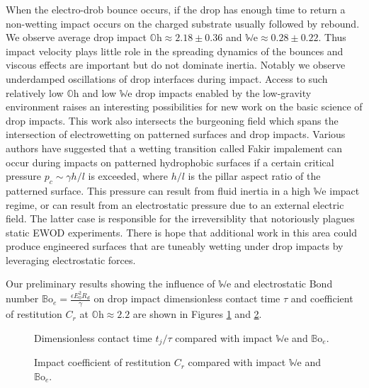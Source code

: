 \documentclass[12pt,a4paper,oneside]{book}
\begin{document}
When the electro-drob bounce occurs, if the drop has enough time to return a non-wetting impact occurs on the charged substrate usually followed by rebound. We observe average drop impact $\mathbb{O}\mbox{h} \approx 2.18 \pm 0.36$ and  $\mathbb{W}\mbox{e} \approx 0.28 \pm 0.22$. Thus impact velocity plays little role in the spreading dynamics of the bounces and viscous effects are important but do not dominate inertia. Notably we observe underdamped oscillations of drop interfaces during impact. Access to such relatively low $\mathbb{O}\mbox{h}$ and low $\mathbb{W}\mbox{e}$ drop impacts enabled by the low-gravity environment raises an interesting possibilities for new work on the basic science of drop impacts. This work also intersects the burgeoning field which spans the intersection of electrowetting on patterned surfaces and drop impacts. Various authors \cite{bartolo_bouncing_2006, reyssat_bouncing_2006} have suggested that a wetting transition called Fakir impalement can occur during impacts on patterned hydrophobic surfaces if a certain critical pressure $p_c \sim \gamma h/l$ is exceeded, where $h/l$ is the pillar aspect ratio of the patterned surface. This pressure can result from fluid inertia in a high $\mathbb{W}\mbox{e}$ impact regime, or can result from an electrostatic pressure due to an external electric field. The latter case is responsible for the irreversiblity that notoriously plagues static EWOD experiments. There is hope that additional work in this area could produce engineered surfaces that are tuneably wetting under drop impacts by leveraging electrostatic forces.
 
Our preliminary results showing the influence of $\mathbb{W}\mbox{e}$ and electrostatic Bond number $\mathbb{B}\mbox{o}_e = \frac{\epsilon E_0^2 R_d}{\gamma} $ on drop impact dimensionless contact time $\tau$ and coefficient of restitution $C_r$ at $\mathbb{O}\mbox{h} \approx 2.2$ are shown in Figures \ref{fig:contact} and \ref{fig:restitution}.

\begin{figure}[htb]
    \centering
    
    \caption{Dimensionless contact time $t_j/\tau$ compared with impact $\mathbb{W}\mbox{e}$ and $\mathbb{B}\mbox{o}_e$.\label{fig:contact}}
\end{figure}

\begin{figure}[htb]
    \centering
    
    \caption{Impact coefficient of restitution $C_r$ compared with impact $\mathbb{W}\mbox{e}$ and $\mathbb{B}\mbox{o}_e$.\label{fig:restitution}}
\end{figure}
\end{document}
